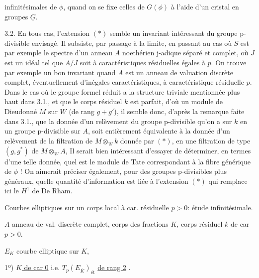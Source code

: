 infinitésimales de $\phi$, quand on se fixe celles de $G(\phi)$ à l'aide d'un cristal en groupes $\underline{G}$.

3.2. En tous cas, l'extension $(*)$ semble un invariant intéressant du groupe p-divisible envisagé. Il subsiste, par passage à la limite, en passant  au cas où $S$ est  par exemple le spectre d'un anneau $A$ noethérien j-adique séparé et complet, où $J$ est un idéal tel que $A/J$ soit à caractéristiques résiduelles égales à $p$. On trouve par exemple un bon invariant quand $A$ est un anneau de valuation discrète complet, éventuellement d'inégales caractéristiques, à caractéristique résiduelle $p$. Dans le cas où le groupe formel\deleted{,} réduit a la structure triviale  mentionnée plus haut dans 3.1., et que le corps résiduel $k$ est parfait, d'où un module de Dieudonné $M$ sur $W$ (de rang $g+g'$), il semble donc, d'après la remarque faite dans 3.1., que la donnée d'un relèvement du groupe p-divisible qu'on a sur $k$ en un groupe p-divisible sur $A$, soit entièrement équivalente à la donnée d'un relèvement de la filtration de $M\otimes_Wk$ donnée par $(*)$, en une filtration de type $(g,g^*)$ de $M\otimes_WA$,  Il serait bien intéressant d'essayer de déterminer, en termes d'une telle donnée, quel est le module de Tate correspondant à la fibre générique de $\phi$ ! On aimerait préciser également, pour des groupes p-divisibles plus généraux, quelle quantité d'information est liée à l'extension $(*)$\inserted{,} qui remplace ici le $H^1$ de De Rham.




Courbes elliptiques sur un  corps local à car. résiduelle $p>0$: étude infinitésimale.

$A$ anneau de val. discrète complet, corps des fractions $K$, corps résiduel $k$ de car $p>0$.

$E_K$ courbe elliptique sur $K$, 

1º) \uline{$K$ de car 0} i.e. $T_p(E_{\overline{K}})_{\text{ét}}$ \uline{de rang 2} .
\margin{\unsure{[}et $T_p(E_{\overline{K}})_{\text{ét}}=T_p(E_{\overline{K}})$]}

